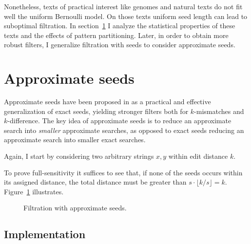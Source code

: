 Nonetheless, texts of practical interest like genomes and natural texts do not fit well the uniform Bernoulli model.
On those texts uniform seed length can lead to suboptimal filtration.
In section~\ref{sec:seeds-apx} I analyze the statistical properties of these texts and the effects of pattern partitioning.
Later, in order to obtain more robust filters, I generalize filtration with seeds to consider approximate seeds.


\section{Approximate seeds}
\label{sec:seeds-apx}

Approximate seeds have been proposed in \citep{Myers1994,Navarro2000} as a practical and effective generalization of exact seeds, yielding stronger filters both for $k$-mismatches and $k$-difference.
The key idea of approximate seeds is to reduce an approximate search into \emph{smaller} approximate searches, as opposed to exact seeds reducing an approximate search into smaller exact searches.

Again, I start by considering two arbitrary strings $x,y$ within edit distance $k$.
To prove full-sensitivity it suffices to see that, if none of the seeds occurs within its assigned distance, the total distance must be greater than $s \cdot \lfloor k/s \rfloor = k$.
Figure~\ref{fig:seeds-apx} illustrates.

\begin{figure}[h]
\begin{center}
\caption[Filtration with approximate seeds]{Filtration with approximate seeds.}
\label{fig:seeds-apx}

\end{center}
\end{figure}

\subsection{Implementation}

